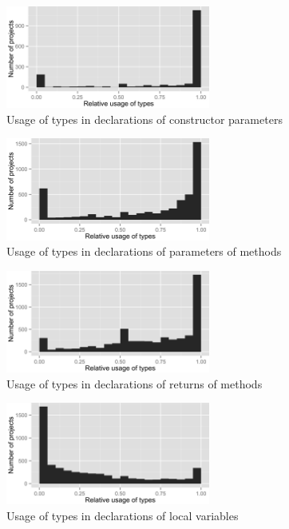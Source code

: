 \begin{figure}[h]
\centering 
\includegraphics[width=0.6\textwidth]{../aosd_2014/analysis/result/script/class/histograms/9_Constructor_Parameter.png} 
\caption{Usage of types in declarations of constructor parameters}
\end{figure}

\begin{figure}[h]
\centering 
\includegraphics[width=0.6\textwidth]{../aosd_2014/analysis/result/script/class/histograms/8_Method_Parameter.png} 
\caption{Usage of types in declarations of parameters of methods}
\end{figure}

\begin{figure}[h]
\centering 
\includegraphics[width=0.6\textwidth]{../aosd_2014/analysis/result/script/class/histograms/7_Method_Return.png} 
\caption{Usage of types in declarations of returns of methods}
\end{figure}

\begin{figure}[h]
\centering 
\includegraphics[width=0.6\textwidth]{../aosd_2014/analysis/result/script/class/histograms/6_Local_Variable.png} 
\caption{Usage of types in declarations of local variables}
\end{figure}

